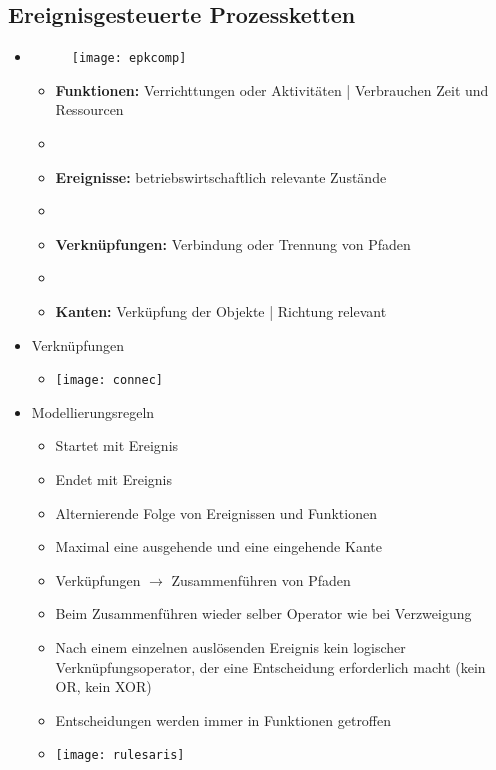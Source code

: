 \subsection{Ereignisgesteuerte Prozessketten}
\begin{itemize}
	\item[]
			\begin{minipage}{0.15\textwidth}
				\begin{figure}[H]
				\texttt{[image: epkcomp]}
				\end{figure}
			\end{minipage}
			\begin{minipage}[t]{0.75\textwidth}
				\vspace{-2.5cm}
				\begin{itemize}
				\item \textbf{Funktionen:} Verrichttungen oder Aktivitäten | Verbrauchen Zeit und Ressourcen
				\item[]
				\item \textbf{Ereignisse:} betriebswirtschaftlich relevante Zustände
				\item[]
				\item \textbf{Verknüpfungen:} Verbindung oder Trennung von Pfaden
				\item[]
				\item \textbf{Kanten:} Verküpfung der Objekte | Richtung relevant
				\end{itemize}
			\end{minipage}
	
	\item Verknüpfungen
		\begin{itemize}
			\item[] \texttt{[image: connec]}
		\end{itemize}
		
	\item Modellierungsregeln
	 	\begin{itemize}
	 	\item Startet mit Ereignis
	 	\item Endet mit Ereignis
	 	\item Alternierende Folge von Ereignissen und Funktionen
	 	\item Maximal eine ausgehende und eine eingehende Kante
	 	\item Verküpfungen $\rightarrow$ Zusammenführen von Pfaden
	 	\item Beim Zusammenführen wieder selber Operator wie bei Verzweigung
	 	\item Nach einem einzelnen auslösenden Ereignis kein logischer Verknüpfungsoperator, der eine Entscheidung erforderlich macht (kein OR, 	
	 		  kein XOR)
	 	\item Entscheidungen werden immer in Funktionen getroffen
	 	\item[] \texttt{[image: rulesaris]}
	 	\end{itemize}
	 	

\end{itemize}
